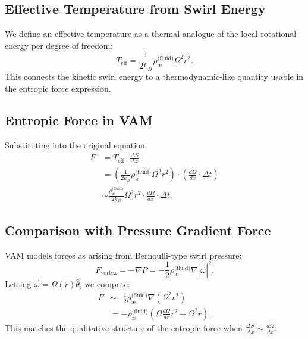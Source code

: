 \documentclass[12pt]{article}
\begin{document}
            \subsection*{Effective Temperature from Swirl Energy}

            We define an effective temperature as a thermal analogue of the local rotational energy per degree of freedom:
            \begin{equation}
                T_\text{eff} = \frac{1}{2k_B} \rho_{\text{\ae}}^{\text{(fluid)}} \Omega^2 r^2.
            \end{equation}
            This connects the kinetic swirl energy to a thermodynamic-like quantity usable in the entropic force expression.

            \subsection{Entropic Force in VAM}

            Substituting into the original equation:
            \begin{align}
                F &= T_\text{eff} \cdot \frac{\Delta S}{\Delta x} \\
                  &= \left( \frac{1}{2k_B} \rho_{\text{\ae}}^{\text{(fluid)}} \Omega^2 r^2 \right) \cdot \left( \frac{d\Omega}{dx} \cdot \Delta t \right) \\
                  &\sim \frac{\rho_{\text{\ae}}^{\text{(fluid)}}}{2k_B} \Omega^2 r^2 \cdot \frac{d\Omega}{dx} \cdot \Delta t.
            \end{align}

            \subsection*{Comparison with Pressure Gradient Force}

            VAM models forces as arising from Bernoulli-type swirl pressure:
            \begin{equation}
                F_\text{vortex} = -\nabla P = -\frac{1}{2} \rho_{\text{\ae}}^{\text{(fluid)}} \nabla |\vec{\omega}|^2.
            \end{equation}
            Letting $\vec{\omega} = \Omega(r) \hat{\theta}$, we compute:
            \begin{align}
                F &\sim -\frac{1}{2} \rho_{\text{\ae}}^{\text{(fluid)}} \nabla (\Omega^2 r^2) \\
                  &= -\rho_{\text{\ae}}^{\text{(fluid)}} \left( \Omega \frac{d\Omega}{dr} r^2 + \Omega^2 r \right).
            \end{align}
            This matches the qualitative structure of the entropic force when $\frac{\Delta S}{\Delta x} \sim \frac{d\Omega}{dx}$.
\end{document}
